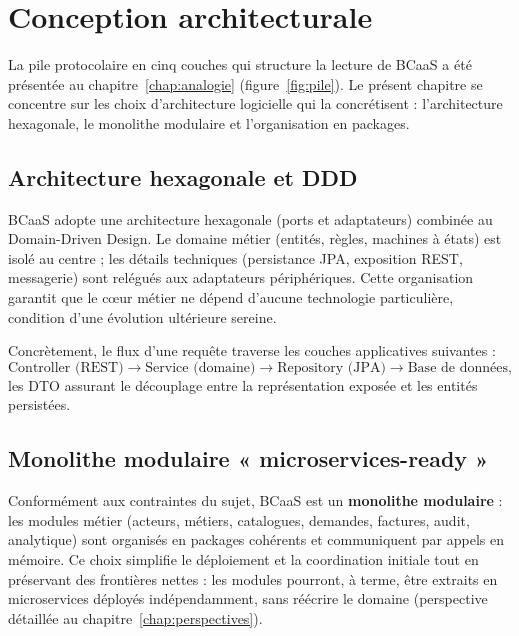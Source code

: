 \chapter{Conception architecturale}
\label{chap:archi}

La pile protocolaire en cinq couches qui structure la lecture de BCaaS a été présentée au
chapitre~\ref{chap:analogie} (figure~\ref{fig:pile}). Le présent chapitre se concentre sur
les choix d'architecture logicielle qui la concrétisent : l'architecture hexagonale, le
monolithe modulaire et l'organisation en packages.

\section{Architecture hexagonale et DDD}

BCaaS adopte une architecture hexagonale (ports et adaptateurs) combinée au Domain-Driven
Design. Le domaine métier (entités, règles, machines à états) est isolé au centre ;
les détails techniques (persistance JPA, exposition REST, messagerie) sont relégués aux
adaptateurs périphériques. Cette organisation garantit que le cœur métier ne dépend
d'aucune technologie particulière, condition d'une évolution ultérieure sereine.

Concrètement, le flux d'une requête traverse les couches applicatives suivantes :
\[
\text{Controller (REST)} \to \text{Service (domaine)} \to \text{Repository (JPA)} \to
\text{Base de données},
\]
les DTO assurant le découplage entre la représentation exposée et les entités persistées.

\section{Monolithe modulaire « microservices-ready »}

Conformément aux contraintes du sujet, BCaaS est un \textbf{monolithe modulaire} : les
modules métier (acteurs, métiers, catalogues, demandes, factures, audit, analytique) sont
organisés en packages cohérents et communiquent par appels en mémoire. Ce choix simplifie
le déploiement et la coordination initiale tout en préservant des frontières nettes : les
modules pourront, à terme, être extraits en microservices déployés indépendamment, sans
réécrire le domaine (perspective détaillée au chapitre~\ref{chap:perspectives}).


